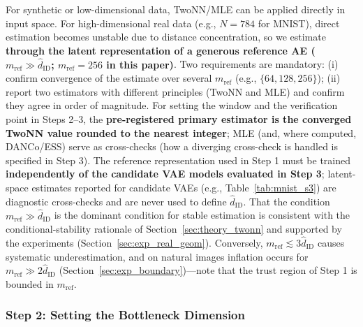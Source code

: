 \documentclass[make,article,submit,pdftex,moreauthors]{Definitions/mdpi}
\newcommand{\hatdID}{\hat{d}_{\mathrm{ID}}}
\begin{document}
For synthetic or low-dimensional data, TwoNN/MLE can be applied directly in
input space.
For high-dimensional real data (e.g., $N = 784$ for MNIST), direct
estimation becomes unstable due to distance concentration, so we estimate
\textbf{through the latent representation of a generous reference AE
($m_{\mathrm{ref}} \gg \hatdID$; $m_{\mathrm{ref}} = 256$ in this paper)}.
Two requirements are mandatory:
(i) confirm convergence of the estimate over several $m_{\mathrm{ref}}$
(e.g., $\{64, 128, 256\}$);
(ii) report two estimators with different principles (TwoNN and MLE) and
confirm they agree in order of magnitude.
For setting the window and the verification point in Steps 2--3, the
\textbf{pre-registered primary estimator is the converged TwoNN value
rounded to the nearest integer}; MLE (and, where computed, DANCo/ESS)
serve as cross-checks (how a diverging cross-check is handled is specified
in Step 3).
The reference representation used in Step 1 must be trained
\textbf{independently of the candidate VAE models evaluated in Step 3};
latent-space estimates reported for candidate VAEs (e.g.,
Table~\ref{tab:mnist_s3}) are diagnostic cross-checks and are never used to
define $\hatdID$.
That the condition $m_{\mathrm{ref}} \gg \hatdID$ is the dominant condition
for stable estimation is consistent with the conditional-stability
rationale of Section~\ref{sec:theory_twonn} and supported by the
experiments (Section~\ref{sec:exp_real_geom}).
Conversely, $m_{\mathrm{ref}} \lesssim 3\hatdID$ causes systematic
underestimation, and on natural images inflation occurs for
$m_{\mathrm{ref}} \gg 2\hatdID$ (Section~\ref{sec:exp_boundary})---note that
the trust region of Step 1 is bounded in $m_{\mathrm{ref}}$.

\subsubsection{Step 2: Setting the Bottleneck Dimension}\label{sec:protocol_s2}
\end{document}
